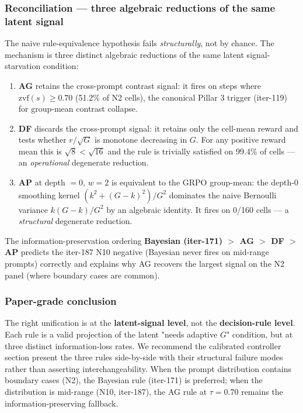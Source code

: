 \documentclass{article}
\begin{document}
\subsubsection*{Reconciliation --- three algebraic reductions of the same latent signal}

The naive rule-equivalence hypothesis fails \emph{structurally}, not by
chance.  The mechanism is three distinct algebraic reductions of the
same latent signal-starvation condition:

\begin{enumerate}
\item \textbf{AG} retains the cross-prompt contrast signal: it fires on
      steps where $\mathrm{zvf}(s) \ge 0.70$ (51.2\% of N2 cells), the
      canonical Pillar 3 trigger (iter-119) for group-mean contrast
      collapse.
\item \textbf{DF} discards the cross-prompt signal: it retains only the
      cell-mean reward and tests whether $r / \sqrt{G}$ is monotone
      decreasing in $G$.  For any positive reward mean this is
      $\sqrt{8} < \sqrt{16}$ and the rule is trivially satisfied on
      99.4\% of cells --- an \emph{operational} degenerate reduction.
\item \textbf{AP} at depth $= 0$, $w = 2$ is equivalent to the GRPO
      group-mean: the depth-0 smoothing kernel $(k^2 + (G-k)^2)/G^2$
      dominates the naive Bernoulli variance $k(G-k)/G^2$ by an
      algebraic identity.  It fires on 0/160 cells --- a
      \emph{structural} degenerate reduction.
\end{enumerate}

\noindent The information-preservation ordering
\textbf{Bayesian (iter-171) $>$ AG $>$ DF $>$ AP} predicts the
iter-187 N10 negative (Bayesian never fires on mid-range prompts)
correctly and explains why AG recovers the largest signal on the
N2 panel (where boundary cases are common).

\subsubsection*{Paper-grade conclusion}

The right unification is at the \textbf{latent-signal level}, not the
\textbf{decision-rule level}.  Each rule is a valid projection of the
latent "needs adaptive $G$" condition, but at three distinct
information-loss rates.  We recommend the calibrated controller
section present the three rules side-by-side with their structural
failure modes rather than asserting interchangeability.  When the
prompt distribution contains boundary cases (N2), the Bayesian rule
(iter-171) is preferred; when the distribution is mid-range (N10,
iter-187), the AG rule at $\tau = 0.70$ remains the
information-preserving fallback. \label{sec:p7-closed-loop-counterfactual}
\end{document}
